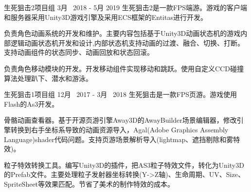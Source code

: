 \begin{cventries}
\cventryproject
{生死狙击2项目组} %
{3月~ 2018 - 5月 2019} %
{生死狙击2是一款FPS端游。游戏的客户端和服务器采用Unity3D游戏引擎及采用ECS框架的Entitas进行开发。}
{ %
\begin{cvitems}
\item {负责角色动画系统的开发和维护。主要内容包括基于Unity3D动画状态机的游戏内部逻辑动画状态机开发和设计,内部状态机支持动画的过渡、融合、切换、打断。支持动画组件的状态同步、动画回放和状态回滚。}
\item{负责角色移动模块的开发。开发移动组件实现移动和跳跃。使用自定义CCD碰撞算法处理趴下、潜水和游泳。}
\end{cvitems}
}

\cventryproject
{生死狙击1项目组} %
{12月~ 2017 - 3月~ 2018} %
{生死狙击是一款FPS页游。游戏使用Flash的As3开发。}
{ %
	\begin{cvitems}
		\item {骨骼动画查看器。基于开源页游引擎Away3D的AwayBuilder场景编辑器，修改引擎转换到右手坐标系导致的动画资源导入，Agal(Adobe Graphics Assembly Language)shader代码问题。支持页游场景解析导入(lightmap、遮挡剔除和雾特效)。}
		\item {粒子特效转换工具。编写Unity3D的插件，把AS3粒子特效文件，转化为Unity3D的Prefab文件。主要处理粒子发射器坐标转换(Y->Z轴)、生命周期、UV、Size、SpriteSheet等效果匹配。节省了美术的制作特效的成本。}
	\end{cvitems}
}



\end{cventries}
